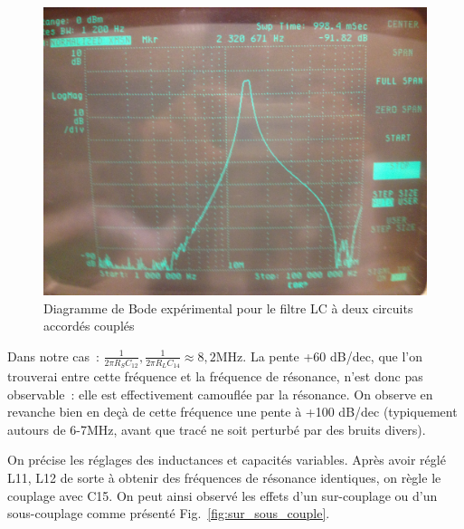 \documentclass{article}
\begin{document}
\begin{figure}[h]
	\centering
	\includegraphics[width=.5\textwidth]{1MHz_100MHz}
	\caption{Diagramme de Bode expérimental pour le filtre LC à deux circuits accordés couplés}
	\label{fig:LC2plot}
\end{figure}

Dans notre cas~: ${\frac{1}{2\pi R_S C_{12}}, \frac{1}{2\pi R_L C_{14}}\approx 8,2\mathrm{MHz}}$. La pente +60 dB/dec, que l'on trouverai entre cette fréquence et la fréquence de résonance, n'est donc pas observable~: elle est effectivement camouflée par la résonance. On observe en revanche bien en deçà de cette fréquence une pente à +100 dB/dec (typiquement autours de 6-7MHz, avant que tracé ne soit perturbé par des bruits divers).




On précise les réglages des inductances et capacités variables. Après avoir réglé L11, L12 de sorte à obtenir des fréquences de résonance identiques, on règle le couplage avec C15. On peut ainsi observé les effets d'un sur-couplage ou d'un sous-couplage comme présenté Fig.~\ref{fig:sur_sous_couple}.
\end{document}
